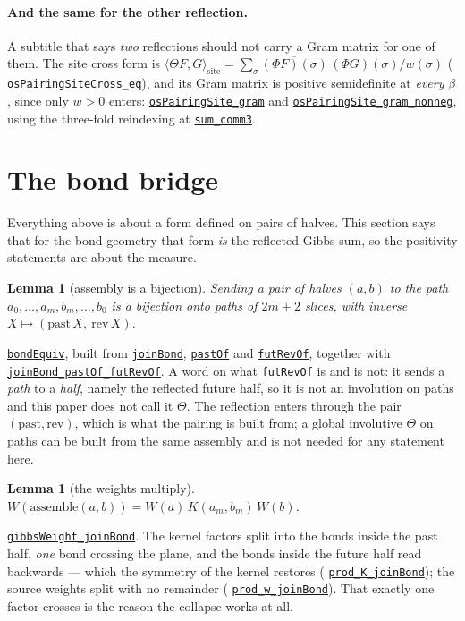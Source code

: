 \documentclass[11pt]{article}
\newtheorem{lemma}[theorem]{Lemma}
\theoremstyle{definition}
\newcommand{\anchor}{2d0346b2cc75d1cdf2e0ea0cefea4a8ef3be9c84}
\newcommand{\osline}[3]{%
  \href{https://github.com/lluiseriksson/THE-ERIKSSON-PROGRAMME/blob/\anchor/YangMills/OS/#1.lean\#L#2}{\nolinkurl{#3}}}
\begin{document}
\paragraph{And the same for the other reflection.}  A subtitle that says
\emph{two} reflections should not carry a Gram matrix for one of them.  The site
cross form is
$\langle\Theta F,G\rangle_{\mathrm{site}}
   =\sum_\sigma \overline{(\Phi F)(\sigma)}\,(\Phi G)(\sigma)/w(\sigma)$
(\osline{SpatialOS}{517}{osPairingSiteCross\_eq}), and its Gram matrix is positive
semidefinite at \emph{every} $\beta$, since only $w>0$ enters:
\osline{SpatialOS}{541}{osPairingSite\_gram} and
\osline{SpatialOS}{565}{osPairingSite\_gram\_nonneg}, using the three-fold
reindexing at \osline{SpatialOS}{371}{sum\_comm3}.

\section{The bond bridge}\label{sec:bridge}

Everything above is about a form defined on pairs of halves.  This section says
that for the bond geometry that form \emph{is} the reflected Gibbs sum, so the
positivity statements are about the measure.

\begin{lemma}[assembly is a bijection]\label{lem:bij}
Sending a pair of halves $(a,b)$ to the path
$a_0,\dots,a_m,b_m,\dots,b_0$ is a bijection onto paths of $2m+2$ slices, with
inverse $X\mapsto(\mathrm{past}\,X,\ \mathrm{rev}\,X)$.
\end{lemma}

\osline{SpatialOS}{628}{bondEquiv}, built from
\osline{SpatialOS}{586}{joinBond},
\osline{SpatialOS}{591}{pastOf} and
\osline{SpatialOS}{598}{futRevOf}, together with
\osline{SpatialOS}{613}{joinBond\_pastOf\_futRevOf}.  A word on what
\texttt{futRevOf} is and is not: it sends a \emph{path} to a \emph{half}, namely
the reflected future half, so it is not an involution on paths and this paper
does not call it $\Theta$.  The reflection enters through the pair
$(\mathrm{past},\mathrm{rev})$, which is what the pairing is built from; a global
involutive $\Theta$ on paths can be built from the same assembly and is not
needed for any statement here.

\begin{lemma}[the weights multiply]\label{lem:weight}
$W(\mathrm{assemble}(a,b)) = W(a)\,K(a_m,b_m)\,W(b)$.
\end{lemma}

\osline{SpatialOS}{726}{gibbsWeight\_joinBond}.  The kernel factors split into the
bonds inside the past half, \emph{one} bond crossing the plane, and the bonds
inside the future half read backwards --- which the symmetry of the kernel
restores (\osline{SpatialOS}{684}{prod\_K\_joinBond}); the source weights split with
no remainder (\osline{SpatialOS}{668}{prod\_w\_joinBond}).  That exactly one factor
crosses is the reason the collapse works at all.
\end{document}
